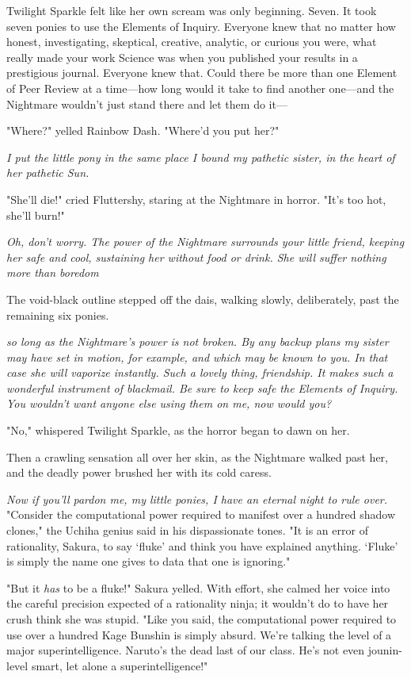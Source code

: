 Twilight Sparkle felt like her own scream was only beginning. Seven. It took
seven ponies to use the Elements of Inquiry. Everyone knew that no matter how
honest, investigating, skeptical, creative, analytic, or curious you were, what
really made your work Science was when you published your results in a
prestigious journal. Everyone knew that. Could there be more than one Element
of Peer Review at a time—how long would it take to find another one—and the
Nightmare wouldn't just stand there and let them do it—

"Where?" yelled Rainbow Dash. "Where'd you put her?"

\emph{I put the little pony in the same place I bound my pathetic sister, in
the heart of her pathetic Sun.}

"She'll die!" cried Fluttershy, staring at the Nightmare in horror. "It's too
hot, she'll burn!"

\emph{Oh, don't worry. The power of the Nightmare surrounds your little friend,
keeping her safe and cool, sustaining her without food or drink. She will
suffer nothing more than boredom{\el}}

The void-black outline stepped off the dais, walking slowly, deliberately, past
the remaining six ponies.

\emph{{\el}so long as the Nightmare's power is not broken. By any backup
plans my sister may have set in motion, for example, and which may be known to
you. In that case she will vaporize instantly. Such a lovely thing, friendship.
It makes such a wonderful instrument of blackmail. Be sure to keep safe the
Elements of Inquiry. You wouldn't want anyone else using them on me, now would
you?}

"No," whispered Twilight Sparkle, as the horror began to dawn on her.

Then a crawling sensation all over her skin, as the Nightmare walked past her,
and the deadly power brushed her with its cold caress.

\emph{Now if you'll pardon me, my little ponies, I have an eternal night to
rule over.}
\sbreak
"Consider the computational power required to manifest over a hundred shadow
clones," the Uchiha genius said in his dispassionate tones. "It is an error of
rationality, Sakura, to say `fluke' and think you have explained anything.
`Fluke' is simply the name one gives to data that one is ignoring."

"But it \emph{has} to be a fluke!" Sakura yelled. With effort, she calmed her
voice into the careful precision expected of a rationality ninja; it wouldn't
do to have her crush think she was stupid. "Like you said, the computational
power required to use over a hundred Kage Bunshin is simply absurd. We're
talking the level of a major superintelligence. Naruto's the dead last of our
class. He's not even jounin-level smart, let alone a superintelligence!"

